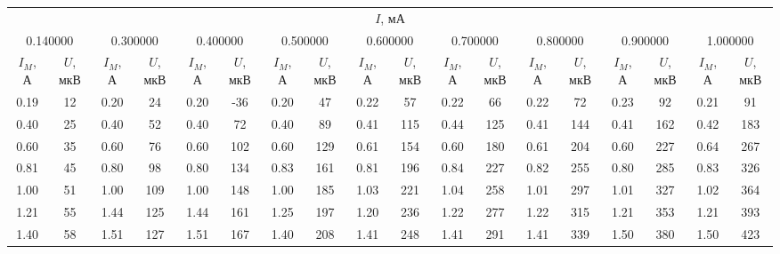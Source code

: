 \begin{tabular}{cccccccccccccccccc}
\toprule
\multicolumn{18}{c}{$I$, мА} \\
\multicolumn{2}{c}{0.140000} & \multicolumn{2}{c}{0.300000} & \multicolumn{2}{c}{0.400000} & \multicolumn{2}{c}{0.500000} & \multicolumn{2}{c}{0.600000} & \multicolumn{2}{c}{0.700000} & \multicolumn{2}{c}{0.800000} & \multicolumn{2}{c}{0.900000} & \multicolumn{2}{c}{1.000000} \\
$I_M$, А & $U$, мкВ & $I_M$, А & $U$, мкВ & $I_M$, А & $U$, мкВ & $I_M$, А & $U$, мкВ & $I_M$, А & $U$, мкВ & $I_M$, А & $U$, мкВ & $I_M$, А & $U$, мкВ & $I_M$, А & $U$, мкВ & $I_M$, А & $U$, мкВ \\
\midrule
0.19 & 12 & 0.20 & 24 & 0.20 & -36 & 0.20 & 47 & 0.22 & 57 & 0.22 & 66 & 0.22 & 72 & 0.23 & 92 & 0.21 & 91 \\
0.40 & 25 & 0.40 & 52 & 0.40 & 72 & 0.40 & 89 & 0.41 & 115 & 0.44 & 125 & 0.41 & 144 & 0.41 & 162 & 0.42 & 183 \\
0.60 & 35 & 0.60 & 76 & 0.60 & 102 & 0.60 & 129 & 0.61 & 154 & 0.60 & 180 & 0.61 & 204 & 0.60 & 227 & 0.64 & 267 \\
0.81 & 45 & 0.80 & 98 & 0.80 & 134 & 0.83 & 161 & 0.81 & 196 & 0.84 & 227 & 0.82 & 255 & 0.80 & 285 & 0.83 & 326 \\
1.00 & 51 & 1.00 & 109 & 1.00 & 148 & 1.00 & 185 & 1.03 & 221 & 1.04 & 258 & 1.01 & 297 & 1.01 & 327 & 1.02 & 364 \\
1.21 & 55 & 1.44 & 125 & 1.44 & 161 & 1.25 & 197 & 1.20 & 236 & 1.22 & 277 & 1.22 & 315 & 1.21 & 353 & 1.21 & 393 \\
1.40 & 58 & 1.51 & 127 & 1.51 & 167 & 1.40 & 208 & 1.41 & 248 & 1.41 & 291 & 1.41 & 339 & 1.50 & 380 & 1.50 & 423 \\
\bottomrule
\end{tabular}
